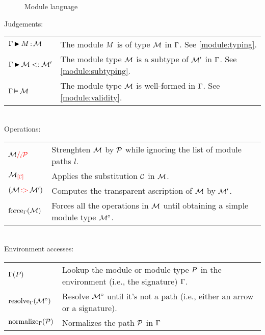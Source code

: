\documentclass{article}
\theoremstyle{definition}
\begin{document}
\begin{figure}[!hb]
  
  \caption{Module language}
  \label{grammar}
\end{figure}

Judgements:\\
\begin{tabular}{ll}
  $\Gamma \operatorname{\blacktriangleright}_{} M \operatorname{:} \mathcal M$
  &The module $M$ is of type $\mathcal M$ in $\Gamma$.
  See \cref{module:typing}.\\

  $\Gamma \operatorname{\blacktriangleright}_{} \mathcal M <: \mathcal M'$&
  The module type $\mathcal M$ is a subtype of $\mathcal M'$ in $\Gamma$.
  See \cref{module:subtyping}.\\

  $\Gamma \operatorname{\vDash}_{} \mathcal M$ &
  The module type $\mathcal M$ is well-formed in $\Gamma$.
  See \cref{module:validity}.
\end{tabular}\\

Operations:\\
\begin{tabular}{ll}
  $\mathcal M{\color{red}/_{l}\mathcal P}$
  & Strenghten $\mathcal M$ by $\mathcal P$ while ignoring the list of module paths $l$.\\
  ${\mathcal M}_{\color{red}\left[\mathcal C\right]}$
  & Applies the substitution $\mathcal C$ in $\mathcal M$.\\
  $(\mathcal M \operatorname{{\color{red}:\!>}} \mathcal M')$
  & Computes the transparent ascription of $\mathcal M$ by $\mathcal M'$.\\
  $\operatorname{force}_{\Gamma}(\mathcal M)$
  & Forces all the operations in $\mathcal M$ until obtaining a simple module type ${\mathcal M^\circ}$.
\end{tabular}\\

Environment accesses:\\
\begin{tabular}{ll}
  $\Gamma(P)$
  & Lookup the module or module type $P$ in the environment (i.e., the signature)
    $\Gamma$.\\
  $\operatorname{resolve}_{\Gamma}({\mathcal M^\circ})$
  & Resolve ${\mathcal M^\circ}$ until it's not a path (i.e., either an arrow or a signature).\\
  $\operatorname{normalize}_{\Gamma}(\mathcal P)$
  & Normalizes the path $\mathcal P$ in $\Gamma$
\end{tabular}

\begin{figure}[hbt]
  
\end{figure}


\begin{figure}[hbt]
  
\end{figure}
\end{document}
